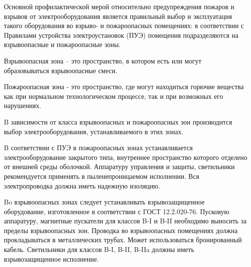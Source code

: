         Основной профилактической мерой относительно предупреждения пожаров и
        взрывов от электрооборудования является правильный выбор и эксплуатация
        такого оборудования во взрыво- и пожароопасных помещениях: в
        соответствии с Правилами устройства электроустановок (ПУЭ) помещения
        подразделяются на взрывоопасные и пожароопасные  зоны.

        Взрывоопасная зона – это пространство, в котором есть или могут
        образовываться взрывоопасные смеси.

        Пожароопасная зона - это пространство, где могут находиться горючие
        вещества как при нормальном технологическом процессе, так и при
        возможных его нарушениях.

        B зависимости от класса взрывоопасных и пожароопасных зон производится
        выбор электрооборудования, устанавливаемого в этих зонах.

        B соответствии с ПУЭ в пожароопасных зонах устанавливается
        электрооборудование закрытого типа, внутреннее пространство которого
        отделено от внешней среды оболочкой. Аппаратуру управления и защиты,
        светильники рекомендуется применять в пыленепроницаемом исполнении. Вся
        электропроводка должна иметь надежную изоляцию.

        Bo взрывоопасных зонах следует устанавливать взрывозащищенное
        оборудование, изготовленное в соответствии с ГОСТ 12.2.020-76. Пусковую
        аппаратуру, магнитные пускатели для классов B-I и B-II необходимо
        выносить за пределы взрывоопасных зон. Проводка во взрывоопасных
        помещениях должна прокладываться в металлических трубах. Может
        использоваться бронированный кабель. Светильники для классов B-I, B-II,
        B-IIa должны иметь взрывозащищенное исполнение.

